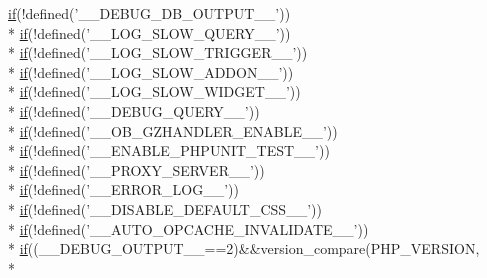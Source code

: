 \begin{DoxyCompactItemize}
\hyperlink{config_8inc_8php_a95d67dac5da3e46d0b07e9ad1647d08a}{if}(!defined('\-\_\-\-\_\-\-D\-E\-B\-U\-G\-\_\-\-D\-B\-\_\-\-O\-U\-T\-P\-U\-T\-\_\-\-\_\-')) \\*
\hyperlink{config_8inc_8php_a95d67dac5da3e46d0b07e9ad1647d08a}{if}(!defined('\-\_\-\-\_\-\-L\-O\-G\-\_\-\-S\-L\-O\-W\-\_\-\-Q\-U\-E\-R\-Y\-\_\-\-\_\-')) \\*
\hyperlink{config_8inc_8php_a95d67dac5da3e46d0b07e9ad1647d08a}{if}(!defined('\-\_\-\-\_\-\-L\-O\-G\-\_\-\-S\-L\-O\-W\-\_\-\-T\-R\-I\-G\-G\-E\-R\-\_\-\-\_\-')) \\*
\hyperlink{config_8inc_8php_a95d67dac5da3e46d0b07e9ad1647d08a}{if}(!defined('\-\_\-\-\_\-\-L\-O\-G\-\_\-\-S\-L\-O\-W\-\_\-\-A\-D\-D\-O\-N\-\_\-\-\_\-')) \\*
\hyperlink{config_8inc_8php_a95d67dac5da3e46d0b07e9ad1647d08a}{if}(!defined('\-\_\-\-\_\-\-L\-O\-G\-\_\-\-S\-L\-O\-W\-\_\-\-W\-I\-D\-G\-E\-T\-\_\-\-\_\-')) \\*
\hyperlink{config_8inc_8php_a95d67dac5da3e46d0b07e9ad1647d08a}{if}(!defined('\-\_\-\-\_\-\-D\-E\-B\-U\-G\-\_\-\-Q\-U\-E\-R\-Y\-\_\-\-\_\-')) \\*
\hyperlink{config_8inc_8php_a95d67dac5da3e46d0b07e9ad1647d08a}{if}(!defined('\-\_\-\-\_\-\-O\-B\-\_\-\-G\-Z\-H\-A\-N\-D\-L\-E\-R\-\_\-\-E\-N\-A\-B\-L\-E\-\_\-\-\_\-')) \\*
\hyperlink{config_8inc_8php_a95d67dac5da3e46d0b07e9ad1647d08a}{if}(!defined('\-\_\-\-\_\-\-E\-N\-A\-B\-L\-E\-\_\-\-P\-H\-P\-U\-N\-I\-T\-\_\-\-T\-E\-S\-T\-\_\-\-\_\-')) \\*
\hyperlink{config_8inc_8php_a95d67dac5da3e46d0b07e9ad1647d08a}{if}(!defined('\-\_\-\-\_\-\-P\-R\-O\-X\-Y\-\_\-\-S\-E\-R\-V\-E\-R\-\_\-\-\_\-')) \\*
\hyperlink{config_8inc_8php_a95d67dac5da3e46d0b07e9ad1647d08a}{if}(!defined('\-\_\-\-\_\-\-E\-R\-R\-O\-R\-\_\-\-L\-O\-G\-\_\-\-\_\-')) \\*
\hyperlink{config_8inc_8php_a95d67dac5da3e46d0b07e9ad1647d08a}{if}(!defined('\-\_\-\-\_\-\-D\-I\-S\-A\-B\-L\-E\-\_\-\-D\-E\-F\-A\-U\-L\-T\-\_\-\-C\-S\-S\-\_\-\-\_\-')) \\*
\hyperlink{config_8inc_8php_a95d67dac5da3e46d0b07e9ad1647d08a}{if}(!defined('\-\_\-\-\_\-\-A\-U\-T\-O\-\_\-\-O\-P\-C\-A\-C\-H\-E\-\_\-\-I\-N\-V\-A\-L\-I\-D\-A\-T\-E\-\_\-\-\_\-')) \\*
\hyperlink{config_8inc_8php_a95d67dac5da3e46d0b07e9ad1647d08a}{if}((\-\_\-\-\_\-\-D\-E\-B\-U\-G\-\_\-\-O\-U\-T\-P\-U\-T\-\_\-\-\_\-==2)\&\&version\-\_\-compare(P\-H\-P\-\_\-\-V\-E\-R\-S\-I\-O\-N, \\*

\end{DoxyCompactItemize}
